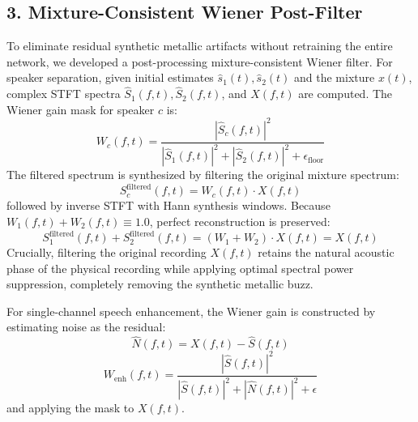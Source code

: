 \documentclass[11pt,a4paper]{report}
\begin{document}
\subsection{3. Mixture-Consistent Wiener Post-Filter}
To eliminate residual synthetic metallic artifacts without retraining the entire network, we developed a post-processing mixture-consistent Wiener filter. For speaker separation, given initial estimates $\hat{s}_1(t), \hat{s}_2(t)$ and the mixture $x(t)$, complex STFT spectra $\hat{S}_1(f, t), \hat{S}_2(f, t)$, and $X(f, t)$ are computed. The Wiener gain mask for speaker $c$ is:
\begin{equation}
    W_c(f, t) = \frac{|\hat{S}_c(f, t)|^2}{|\hat{S}_1(f, t)|^2 + |\hat{S}_2(f, t)|^2 + \epsilon_{\text{floor}}}
    \label{eq:wiener_separation}
\end{equation}
The filtered spectrum is synthesized by filtering the original mixture spectrum:
\begin{equation}
    S_c^{\text{filtered}}(f, t) = W_c(f, t) \cdot X(f, t)
\end{equation}
followed by inverse STFT with Hann synthesis windows. Because $W_1(f, t) + W_2(f, t) \equiv 1.0$, perfect reconstruction is preserved:
\begin{equation}
    S_1^{\text{filtered}}(f, t) + S_2^{\text{filtered}}(f, t) = (W_1 + W_2) \cdot X(f, t) = X(f, t)
\end{equation}
Crucially, filtering the original recording $X(f, t)$ retains the natural acoustic phase of the physical recording while applying optimal spectral power suppression, completely removing the synthetic metallic buzz.

For single-channel speech enhancement, the Wiener gain is constructed by estimating noise as the residual:
\begin{equation}
    \hat{N}(f, t) = X(f, t) - \hat{S}(f, t)
\end{equation}
\begin{equation}
    W_{\text{enh}}(f, t) = \frac{|\hat{S}(f, t)|^2}{|\hat{S}(f, t)|^2 + |\hat{N}(f, t)|^2 + \epsilon}
\end{equation}
and applying the mask to $X(f, t)$.
\end{document}
